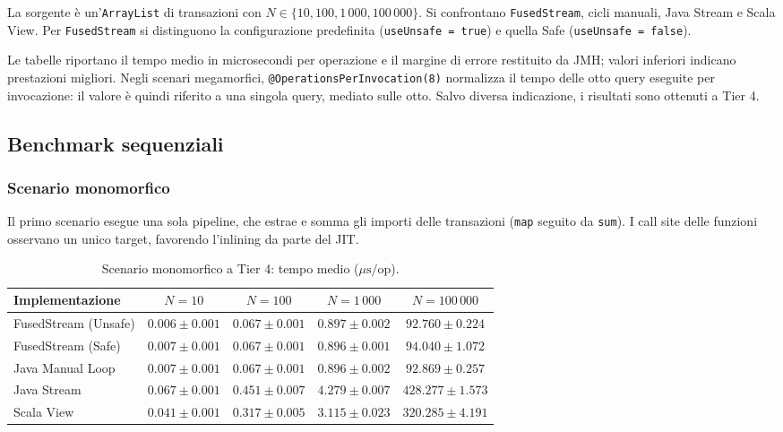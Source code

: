 \documentclass[a4paper,11pt]{report}
\theoremstyle{definition}
\begin{document}
La sorgente è un'\texttt{ArrayList} di transazioni con $N \in \{10, 100, 1\,000, 100\,000\}$. Si confrontano \texttt{FusedStream}, cicli manuali, Java Stream e Scala View. Per \texttt{FusedStream} si distinguono la configurazione predefinita (\texttt{useUnsafe = true}) e quella Safe (\texttt{useUnsafe = false}).

Le tabelle riportano il tempo medio in microsecondi per operazione e il margine di errore restituito da JMH; valori inferiori indicano prestazioni migliori. Negli scenari megamorfici, \texttt{@OperationsPerInvocation(8)} normalizza il tempo delle otto query eseguite per invocazione: il valore è quindi riferito a una singola query, mediato sulle otto. Salvo diversa indicazione, i risultati sono ottenuti a Tier 4.

\subsection{Benchmark sequenziali}
\label{subsec:bench-sequenziali}

\subsubsection{Scenario monomorfico}
\label{subsubsec:bench-monomorfico}

Il primo scenario esegue una sola pipeline, che estrae e somma gli importi delle transazioni (\texttt{map} seguito da \texttt{sum}). I call site delle funzioni osservano un unico target, favorendo l'inlining da parte del JIT.

\begin{table}[htbp]
  \centering
  \caption{Scenario monomorfico a Tier 4: tempo medio ($\mu\text{s}/\text{op}$).}
  \label{tab:bench_mono}
  \vspace{2mm}
  \small
  \setlength{\tabcolsep}{4pt}
  \begin{tabular}{lcccc}
    \toprule
    \textbf{Implementazione}      & \textbf{$N = 10$} & \textbf{$N = 100$} & \textbf{$N = 1\,000$} & \textbf{$N = 100\,000$} \\
    \midrule
    \textsf{FusedStream (Unsafe)} & $0.006 \pm 0.001$ & $0.067 \pm 0.001$  & $0.897 \pm 0.002$     & $92.760 \pm 0.224$      \\
    \textsf{FusedStream (Safe)}   & $0.007 \pm 0.001$ & $0.067 \pm 0.001$  & $0.896 \pm 0.001$     & $94.040 \pm 1.072$      \\
    \textsf{Java Manual Loop}     & $0.007 \pm 0.001$ & $0.067 \pm 0.001$  & $0.896 \pm 0.002$     & $92.869 \pm 0.257$      \\
    \textsf{Java Stream}          & $0.067 \pm 0.001$ & $0.451 \pm 0.007$  & $4.279 \pm 0.007$     & $428.277 \pm 1.573$     \\
    \textsf{Scala View}           & $0.041 \pm 0.001$ & $0.317 \pm 0.005$  & $3.115 \pm 0.023$     & $320.285 \pm 4.191$     \\
    \bottomrule
  \end{tabular}
\end{table}
\end{document}
